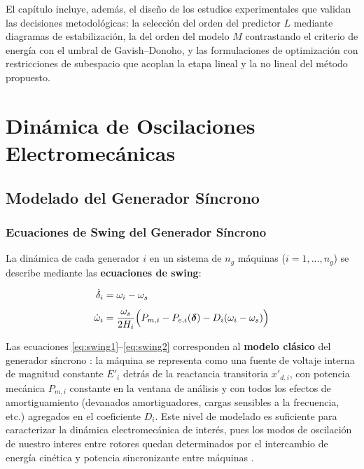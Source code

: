 El capítulo incluye, además, el diseño de los estudios experimentales que
validan las decisiones metodológicas: la selección del orden del predictor
$L$ mediante diagramas de estabilización, la del orden del modelo $M$
contrastando el criterio de energía con el umbral de Gavish--Donoho, y las
formulaciones de optimización con restricciones de subespacio que acoplan
la etapa lineal y la no lineal del método propuesto.



\section{Dinámica de Oscilaciones Electromecánicas}

\subsection{Modelado del Generador Síncrono}
\subsubsection{Ecuaciones de Swing del Generador Síncrono}

La dinámica de cada generador $i$ en un sistema de $n_g$ máquinas ($i=1,\ldots,n_g$) se describe mediante las \textbf{ecuaciones de swing}:

\begin{align}
    \dot{\delta}_i  &= \omega_i - \omega_s \label{eq:swing1} \\[4pt]
    \dot{\omega}_i  &= \frac{\omega_s}{2H_i}
                       \Bigl(P_{m,i} - P_{e,i}(\boldsymbol{\delta}) - D_i(\omega_i - \omega_s)\Bigr)
                       \label{eq:swing2}
\end{align}

Las ecuaciones \eqref{eq:swing1}--\eqref{eq:swing2} corresponden al
\textbf{modelo clásico} del generador síncrono \cite{kundur1994}: la máquina
se representa como una fuente de voltaje interna de magnitud constante
$E'_i$ detrás de la reactancia transitoria $x'_{d,i}$, con potencia mecánica
$P_{m,i}$ constante en la ventana de análisis y con todos los efectos de
amortiguamiento (devanados amortiguadores, cargas sensibles a la frecuencia, etc.)
agregados en el coeficiente $D_i$. Este nivel de modelado es suficiente para
caracterizar la dinámica electromecánica de interés, pues los modos de
oscilación de nuestro interes  entre rotores quedan determinados por el intercambio de energía
cinética y potencia sincronizante entre máquinas \cite{kundur1994,sauer2017}.


